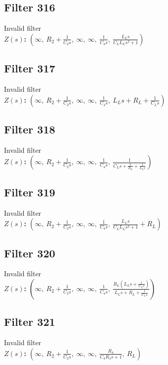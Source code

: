 \documentclass{article}
\begin{document}
\subsection*{Filter 316}
Invalid filter \\ 
\textbf{$Z(s)$:} $\left( \infty, \  R_{2} + \frac{1}{C_{2} s}, \  \infty, \  \infty, \  \frac{1}{C_{4} s}, \  \frac{L_{L} s}{C_{L} L_{L} s^{2} + 1}\right)$ \\ 
\subsection*{Filter 317}
Invalid filter \\ 
\textbf{$Z(s)$:} $\left( \infty, \  R_{2} + \frac{1}{C_{2} s}, \  \infty, \  \infty, \  \frac{1}{C_{4} s}, \  L_{L} s + R_{L} + \frac{1}{C_{L} s}\right)$ \\ 
\subsection*{Filter 318}
Invalid filter \\ 
\textbf{$Z(s)$:} $\left( \infty, \  R_{2} + \frac{1}{C_{2} s}, \  \infty, \  \infty, \  \frac{1}{C_{4} s}, \  \frac{1}{C_{L} s + \frac{1}{R_{L}} + \frac{1}{L_{L} s}}\right)$ \\ 
\subsection*{Filter 319}
Invalid filter \\ 
\textbf{$Z(s)$:} $\left( \infty, \  R_{2} + \frac{1}{C_{2} s}, \  \infty, \  \infty, \  \frac{1}{C_{4} s}, \  \frac{L_{L} s}{C_{L} L_{L} s^{2} + 1} + R_{L}\right)$ \\ 
\subsection*{Filter 320}
Invalid filter \\ 
\textbf{$Z(s)$:} $\left( \infty, \  R_{2} + \frac{1}{C_{2} s}, \  \infty, \  \infty, \  \frac{1}{C_{4} s}, \  \frac{R_{L} \left(L_{L} s + \frac{1}{C_{L} s}\right)}{L_{L} s + R_{L} + \frac{1}{C_{L} s}}\right)$ \\ 
\subsection*{Filter 321}
Invalid filter \\ 
\textbf{$Z(s)$:} $\left( \infty, \  R_{2} + \frac{1}{C_{2} s}, \  \infty, \  \infty, \  \frac{R_{4}}{C_{4} R_{4} s + 1}, \  R_{L}\right)$ \\ 
\end{document}

